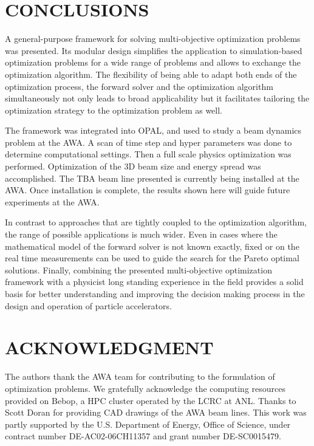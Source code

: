 \documentclass[preprint,linenumbers,amsmath,amssymb,aps,prstab]{revtex4-1}%
\begin{document}
 



\section{CONCLUSIONS} \label{sec:conclusions}

A general-purpose framework for solving multi-objective
  optimization problems was presented.
Its modular design simplifies the application to simulation-based optimization
  problems for a wide range of problems and allows to exchange the
  optimization algorithm.
The flexibility of being able to adapt both ends of the optimization
  process, the forward solver and the optimization algorithm simultaneously
  not only leads to broad applicability but it facilitates
  tailoring the optimization strategy to the optimization problem as well.

The framework was integrated into OPAL, and used 
to study a beam dynamics problem at the AWA.
A scan of time step and hyper parameters was done to determine computational settings.
Then a full scale physics optimization was performed.
Optimization of the 3D beam size and energy spread was accomplished.
The TBA beam line presented is currently being installed at the AWA.
Once installation is complete, 
the results shown here will guide future experiments at the AWA.

In contrast to approaches that are tightly coupled to the optimization
  algorithm, the range of possible applications is much wider.
Even in cases where the mathematical model of the forward solver is not known
  exactly, fixed or on the real time measurements can be used to guide the
  search for the Pareto optimal solutions.
Finally, combining the presented multi-objective optimization framework with
  a physicist long standing experience in the field provides a solid basis
  for better understanding and improving the decision making process in the
  design and operation of particle accelerators.

 


\section{ACKNOWLEDGMENT}

The authors thank the AWA team for contributing to the
  formulation of optimization problems. 
  We gratefully acknowledge the computing resources provided on Bebop,
  a HPC cluster operated by the LCRC at ANL.
  Thanks to Scott Doran for providing CAD drawings of the AWA beam lines.
  This work was partly supported by the 
  U.S. Department of Energy, Office of Science, under 
  contract number DE-AC02-06CH11357 and grant number DE-SC0015479. 
\end{document}
